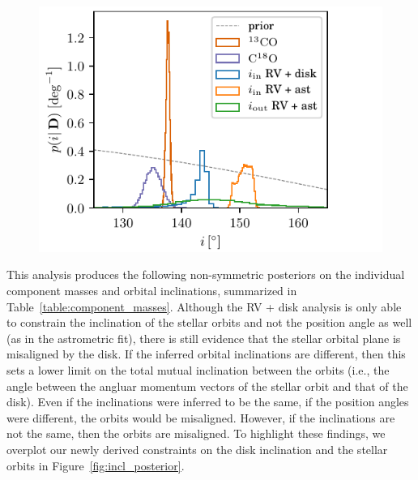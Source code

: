 \documentclass[twocolumn]{aastex61}
\begin{document}
\begin{figure}[ht!]
\begin{center}
  \includegraphics{incl_posterior.pdf}
  \end{center}
\end{figure}

This analysis produces the following non-symmetric posteriors on the individual component masses and orbital inclinations, summarized in Table~\ref{table:component_masses}. Although the RV + disk analysis is only able to constrain the inclination of the stellar orbits and not the position angle as well (as in the astrometric fit), there is still evidence that the stellar orbital plane is misaligned by the disk. If the inferred orbital inclinations are different, then this sets a lower limit on the total mutual inclination between the orbits (i.e., the angle between the angluar momentum vectors of the stellar orbit and that of the disk). Even if the inclinations were inferred to be the same, if the position angles were different, the orbits would be misaligned. However, if the inclinations are not the same, then the orbits are misaligned. To highlight these findings, we overplot our newly derived constraints on the disk inclination and the stellar orbits in Figure~\ref{fig:incl_posterior}. 
\end{document}
